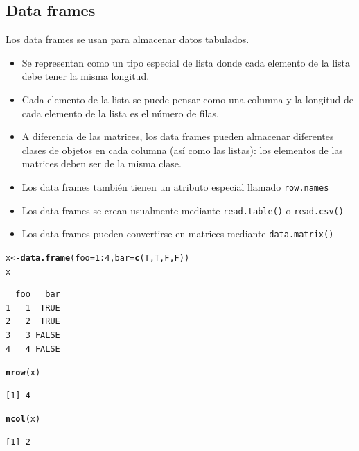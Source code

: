 \documentclass{article}\usepackage[]{graphicx}\usepackage[]{color}
\makeatletter
\newcommand{\hlnum}[1]{\textcolor[rgb]{0.686,0.059,0.569}{#1}}%
\newcommand{\hlopt}[1]{\textcolor[rgb]{0,0,0}{#1}}%
\newcommand{\hlstd}[1]{\textcolor[rgb]{0.345,0.345,0.345}{#1}}%
\newcommand{\hlkwb}[1]{\textcolor[rgb]{0.69,0.353,0.396}{#1}}%
\newcommand{\hlkwc}[1]{\textcolor[rgb]{0.333,0.667,0.333}{#1}}%
\newcommand{\hlkwd}[1]{\textcolor[rgb]{0.737,0.353,0.396}{\textbf{#1}}}%
\newenvironment{kframe}{%
 \def\at@end@of@kframe{}%
 \ifinner\ifhmode%
  \def\at@end@of@kframe{\end{minipage}}%
  \begin{minipage}{\columnwidth}%
 \fi\fi%
 \def\FrameCommand##1{\hskip\@totalleftmargin \hskip-\fboxsep
 \colorbox{shadecolor}{##1}\hskip-\fboxsep
     \hskip-\linewidth \hskip-\@totalleftmargin \hskip\columnwidth}%
 \MakeFramed {\advance\hsize-\width
   \@totalleftmargin\z@ \linewidth\hsize
   \@setminipage}}%
 {\par\unskip\endMakeFramed%
 \at@end@of@kframe}
\newenvironment{knitrout}{}{} %
\makeatother
\begin{document}
  \subsection{Data frames}
    Los data frames se usan para almacenar datos tabulados.
      \begin{itemize}
        \item Se representan como un tipo especial de lista donde cada elemento de la lista debe tener la misma longitud.
        \item Cada elemento de la lista se puede pensar como una columna y la longitud de cada elemento de la lista es el número de filas.
        \item A diferencia de las matrices, los data frames pueden almacenar diferentes clases de objetos en cada columna (así como las listas): los elementos de las matrices deben ser de la misma clase.
        \item Los data frames también tienen un atributo especial llamado 
              \texttt{row.names}
        \item Los data frames se crean usualmente mediante \texttt{read.table()} o                 \texttt{read.csv()}
        \item Los data frames pueden convertirse en matrices mediante 
              \texttt{data.matrix()}
      \end{itemize}
\begin{knitrout}
\color{fgcolor}\begin{kframe}
\begin{alltt}
  \hlstd{x} \hlkwb{<-} \hlkwd{data.frame}\hlstd{(}\hlkwc{foo} \hlstd{=} \hlnum{1}\hlopt{:}\hlnum{4}\hlstd{,} \hlkwc{bar} \hlstd{=} \hlkwd{c}\hlstd{(T, T, F, F))}
  \hlstd{x}
\end{alltt}
\begin{verbatim}
  foo   bar
1   1  TRUE
2   2  TRUE
3   3 FALSE
4   4 FALSE
\end{verbatim}
\begin{alltt}
  \hlkwd{nrow}\hlstd{(x)}
\end{alltt}
\begin{verbatim}
[1] 4
\end{verbatim}
\begin{alltt}
  \hlkwd{ncol}\hlstd{(x)}
\end{alltt}
\begin{verbatim}
[1] 2
\end{verbatim}
\end{kframe}
\end{knitrout}
    
\end{document}
